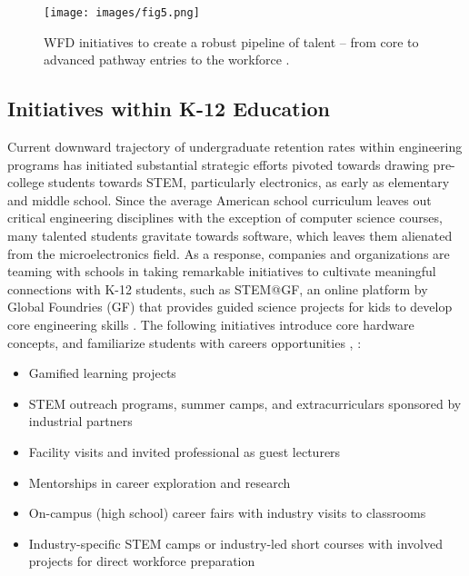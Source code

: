 \begin{figure*}
    \centering
    \texttt{[image: images/fig5.png]}
    \caption{WFD initiatives to create a robust pipeline of talent – from core to advanced pathway entries to the workforce \cite{Zhou2015Industry4T,chapterMAPT,Kindling_undated-br}.}
    \label{fig:5}
\end{figure*}

\subsection{Initiatives within K-12 Education}\label{sec4_1:k_12_and_up}
Current downward trajectory of undergraduate retention rates within engineering programs has initiated substantial strategic efforts pivoted towards drawing pre-college students towards STEM, particularly electronics, as early as elementary and middle school. Since the average American school curriculum leaves out critical engineering disciplines with the exception of computer science courses, many talented students gravitate towards software, which leaves them alienated from the microelectronics field. As a response, companies and organizations are teaming with schools in taking remarkable initiatives to cultivate meaningful connections with K-12 students, such as STEM@GF, an online platform by Global Foundries (GF) that provides guided science projects for kids to develop core engineering skills \cite{STEM_GF}. The following initiatives introduce core hardware concepts, and familiarize students with careers opportunities \cite{Alam2023-hc}, \cite{Nathan_J_Edwards_Carter_Grizzle_Vaanathi_Sekar_Brett_Meadows_Michael_McGivern_Steven_Kiss_Asher_Edwards_John_Branning_Mohamed_Kassem2023-ec}:
\begin{itemize}
    \item {Gamified learning projects}
    \item {STEM outreach programs, summer camps, and extracurriculars sponsored by industrial partners}
    \item {Facility visits and invited professional as guest lecturers}
    \item {Mentorships in career exploration and research}
    \item {On-campus (high school) career fairs with industry visits to classrooms}
    \item {Industry-specific STEM camps or industry-led short courses with involved projects for direct workforce preparation}
\end{itemize}

